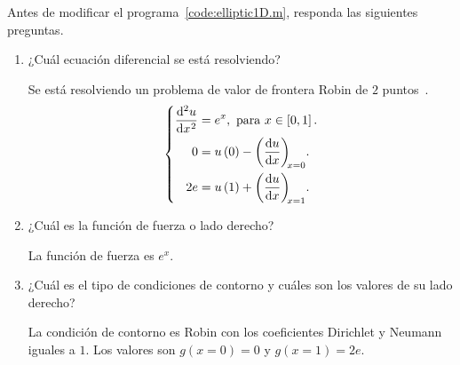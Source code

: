 \begin{problem}

Antes de modificar el programa~\ref{code:elliptic1D.m}, responda las
siguientes preguntas.

\begin{enumerate}
      \item

            ¿Cuál ecuación diferencial se está resolviendo?

            \begin{solution}
                  Se está resolviendo un problema de valor de frontera
                  Robin de $2$ puntos~\cite{CORBINO2020112326}.
                  \begin{equation}\label{eq:poisson1drobindconditions}
                        \left\{
                        \begin{aligned}
                              \diff[2]{u}{x}
                               & =e^{x},
                              \text{ para }x\in\left[0,1\right].     \\
                              0
                               & = u\left(0\right)-\diff{u}{x}[x=0]. \\
                              2e
                               & =u\left(1\right)+\diff{u}{x}[x=1].
                        \end{aligned}
                        \right.
                  \end{equation}
                  \noQED
            \end{solution}

      \item

            ¿Cuál es la función de fuerza o lado derecho?

            \begin{solution}
                  La función de fuerza es $e^{x}$.
                  \noQED
            \end{solution}

      \item

            ¿Cuál es el tipo de condiciones de contorno y cuáles son
            los valores de su lado derecho?

            \begin{solution}
                  La condición de contorno es Robin con los coeficientes
                  Dirichlet y Neumann iguales a $1$.
                  Los valores son $g\left(x=0\right)=0$ y
                  $g\left(x=1\right)=2e$.
                  \noQED
            \end{solution}


\end{enumerate}
\end{problem}
